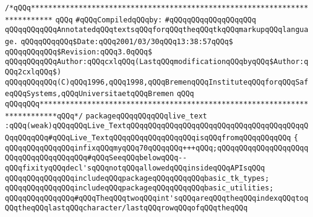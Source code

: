 \label{src/lib/tk/src/live_text.pkg}
\verb|/*qQQq***************************************************************************|\newline
\verb|qQQq|\newline
\verb|#qQQqCompiledqQQqby:|\newline
\verb|#qQQqqQQqqQQqqQQqqQQq|\newline
\newline
\verb|qQQqqQQqqQQqAnnotatedqQQqtextsqQQqforqQQqtheqQQqtkqQQqmarkupqQQqlanguage.|\newline
\newline
\verb|qQQqqQQqqQQq$Date:qQQq2001/03/30qQQq13:38:57qQQq$|\newline
\verb|qQQqqQQqqQQq$Revision:qQQq3.0qQQq$|\newline
\verb|qQQqqQQqqQQqAuthor:qQQqcxlqQQq(LastqQQqmodificationqQQqbyqQQq$Author:qQQq2cxlqQQq$)|\newline
\newline
\verb|qQQqqQQqqQQq(C)qQQq1996,qQQq1998,qQQqBremenqQQqInstituteqQQqforqQQqSafeqQQqSystems,qQQqUniversitaetqQQqBremen|\newline
\verb|qQQq|\newline
\verb|qQQqqQQq**************************************************************************qQQq*/|\newline
\newline
\verb|packageqQQqqQQqqQQqlive_text|\newline
\verb|:qQQq(weak)qQQqqQQqLive_TextqQQqqQQqqQQqqQQqqQQqqQQqqQQqqQQqqQQqqQQqqQQqqQQqqQQq#qQQqLive_TextqQQqqQQqqQQqqQQqqQQqisqQQqfromqQQqqQQqqQQq|\newline
\verb|{|\newline
\verb|qQQqqQQqqQQqqQQqinfixqQQqmyqQQq70qQQqqQQq+++qQQq;qQQqqQQqqQQqqQQqqQQqqQQqqQQqqQQqqQQqqQQq#qQQqSeeqQQqbelowqQQq--qQQqfixityqQQqdecl'sqQQqnotqQQqallowedqQQqinsideqQQqAPIsqQQq|\newline
\newline
\verb|qQQqqQQqqQQqqQQqincludeqQQqpackageqQQqqQQqqQQqbasic_tk_types;|\newline
\verb|qQQqqQQqqQQqqQQqincludeqQQqpackageqQQqqQQqqQQqbasic_utilities;|\newline
\newline
\newline
\verb|qQQqqQQqqQQqqQQq#qQQqTheqQQqtwoqQQqint'sqQQqareqQQqtheqQQqindexqQQqtoqQQqtheqQQqlastqQQqcharacter/lastqQQqrowqQQqofqQQqtheqQQq|\newline
